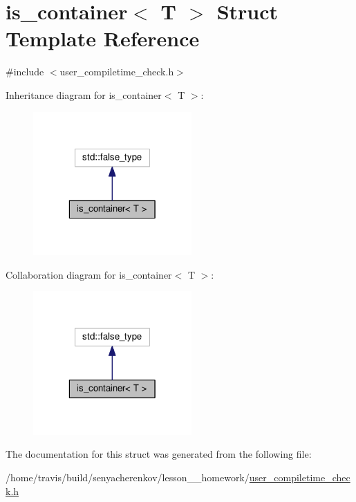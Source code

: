 \hypertarget{structis__container}{\section{is\-\_\-container$<$ T $>$ Struct Template Reference}
\label{structis__container}
}


{\ttfamily \#include $<$user\-\_\-compiletime\-\_\-check.\-h$>$}



Inheritance diagram for is\-\_\-container$<$ T $>$\-:
\nopagebreak
\begin{figure}[H]
\begin{center}
\leavevmode
\includegraphics[width=172pt]{structis__container__inherit__graph}
\end{center}
\end{figure}


Collaboration diagram for is\-\_\-container$<$ T $>$\-:
\nopagebreak
\begin{figure}[H]
\begin{center}
\leavevmode
\includegraphics[width=172pt]{structis__container__coll__graph}
\end{center}
\end{figure}


The documentation for this struct was generated from the following file\-:\begin{DoxyCompactItemize}
\item 
/home/travis/build/senyacherenkov/lesson\-\_\-\_\-homework/\hyperlink{user__compiletime__check_8h}{user\-\_\-compiletime\-\_\-check.\-h}\end{DoxyCompactItemize}
